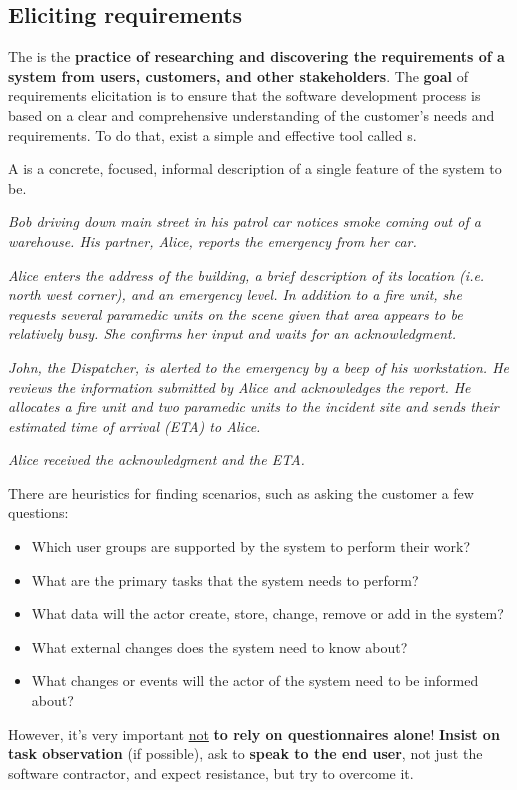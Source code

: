 \subsection{Eliciting requirements}

The  is the \textbf{practice of researching and discovering the requirements of a system from users, customers, and other stakeholders}. The \textbf{goal} of requirements elicitation is to ensure that the software development process is based on a clear and comprehensive understanding of the customer's needs and requirements. To do that, exist a simple and effective tool called s.

\begin{definitionbox}
    A  is a concrete, focused, informal description of a single feature of the system to be.
\end{definitionbox}

\begin{examplebox}\label{example: warehouse on fire}
    \emph{Bob driving down main street in his patrol car notices smoke coming out of a warehouse. His partner, Alice, reports the emergency from her car.}

    \highspace
    \emph{Alice enters the address of the building, a brief description of its location (i.e. north west corner), and an emergency level. In addition to a fire unit, she requests several paramedic units on the scene given that area appears to be relatively busy. She confirms her input and waits for an acknowledgment.}

    \highspace
    \emph{John, the Dispatcher, is alerted to the emergency by a beep of his workstation. He reviews the information submitted by Alice and acknowledges the report. He allocates a fire unit and two paramedic units to the incident site and sends their estimated time of arrival (ETA) to Alice.}

    \highspace
    \emph{Alice received the acknowledgment and the ETA.}
\end{examplebox}
There are heuristics for finding scenarios, such as asking the customer a few questions:
\begin{itemize}
    \item Which user groups are supported by the system to perform their work?
    \item What are the primary tasks that the system needs to perform?
    \item What data will the actor create, store, change, remove or add in the system?
    \item What external changes does the system need to know about?
    \item What changes or events will the actor of the system need to be informed about?
\end{itemize}
However, it's very important \underline{not} \textbf{to rely on questionnaires alone}! \textbf{Insist on task observation} (if possible), ask to \textbf{speak to the end user}, not just the software contractor, and expect resistance, but try to overcome it.

